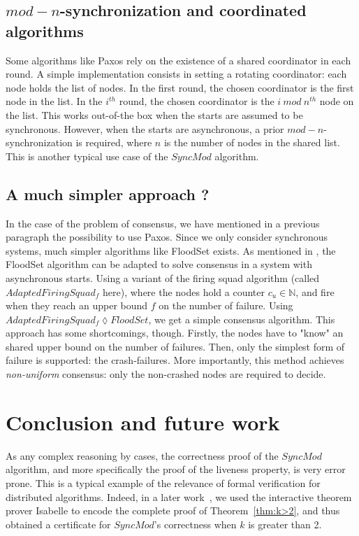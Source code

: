 \documentclass[11pt,letterpaper]{article}
\begin{document}
\subsection{$mod-n$-synchronization and coordinated algorithms}

Some algorithms like Paxos rely on the existence of a shared coordinator in each round.
A simple implementation consists in setting a rotating coordinator: 
each node holds the list of nodes. In the first round, the chosen coordinator is the first node in the list.
In the $i^{th}$ round, the chosen coordinator is the $i~mod~n^{th}$ node on the list.
This works out-of-the box when the starts are assumed to be synchronous.
However, when the starts are asynchronous, a prior $mod-n$-synchronization is required, where $n$ is the number of nodes in the shared list.
This is another typical use case of the $SyncMod$ algorithm.

\subsection{A much simpler approach ?}

In the case of the problem of consensus, we have mentioned in a previous paragraph the possibility to use Paxos.
Since we only consider synchronous systems, much simpler algorithms like FloodSet \cite{Lyn96} exists.
As mentioned in \cite{CDDS85}, the FloodSet algorithm can be adapted to solve consensus in a system with asynchronous starts.
Using a variant of the firing squad algorithm (called $AdaptedFiringSquad_f$ here),
where the nodes hold a counter $c_u \in \mathds{N}$, and fire when they reach an upper bound $f$ on the number of failure.
Using $AdaptedFiringSquad_f \lozenge FloodSet$, we get a simple consensus algorithm.
This approach has some shortcomings, though.
Firstly, the nodes have to "know" an shared upper bound on the number of failures.
Then, only the simplest form of failure is supported: the crash-failures.
More importantly, this method achieves \textit{non-uniform} consensus: only the non-crashed nodes are required to decide.

\section{Conclusion and future work}

As any complex reasoning by cases, the correctness proof  of the $SyncMod$   algorithm, 
	and more specifically the proof of the liveness property, is very error prone. 
This is a typical example of the relevance of formal verification for distributed algorithms. 
Indeed, in a later work~\cite{}, we used the interactive theorem prover Isabelle \cite{Merz12} to encode the complete proof 
	of Theorem~\ref{thm:k>2}, and thus obtained a certificate for  $SyncMod$\!\!'s correctness when $k$ is greater than 2.
	
\end{document}
